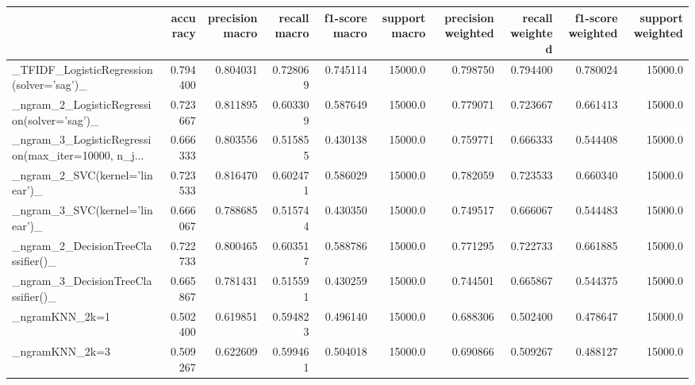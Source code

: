 \begin{tabular}{lrrrrrrrrr}
\toprule
{} &  accuracy &  precision macro &  recall macro &  f1-score macro &  support macro &  precision weighted &  recall weighted &  f1-score weighted &  support weighted \\
\midrule
\_TFIDF\_LogisticRegression(solver='sag')\_           &  0.794400 &         0.804031 &      0.728069 &        0.745114 &        15000.0 &            0.798750 &         0.794400 &           0.780024 &           15000.0 \\
\_ngram\_2\_LogisticRegression(solver='sag')\_         &  0.723667 &         0.811895 &      0.603309 &        0.587649 &        15000.0 &            0.779071 &         0.723667 &           0.661413 &           15000.0 \\
\_ngram\_3\_LogisticRegression(max\_iter=10000, n\_j... &  0.666333 &         0.803556 &      0.515855 &        0.430138 &        15000.0 &            0.759771 &         0.666333 &           0.544408 &           15000.0 \\
\_ngram\_2\_SVC(kernel='linear')\_                     &  0.723533 &         0.816470 &      0.602471 &        0.586029 &        15000.0 &            0.782059 &         0.723533 &           0.660340 &           15000.0 \\
\_ngram\_3\_SVC(kernel='linear')\_                     &  0.666067 &         0.788685 &      0.515744 &        0.430350 &        15000.0 &            0.749517 &         0.666067 &           0.544483 &           15000.0 \\
\_ngram\_2\_DecisionTreeClassifier()\_                 &  0.722733 &         0.800465 &      0.603517 &        0.588786 &        15000.0 &            0.771295 &         0.722733 &           0.661885 &           15000.0 \\
\_ngram\_3\_DecisionTreeClassifier()\_                 &  0.665867 &         0.781431 &      0.515591 &        0.430259 &        15000.0 &            0.744501 &         0.665867 &           0.544375 &           15000.0 \\
\_ngramKNN\_2k=1                                     &  0.502400 &         0.619851 &      0.594823 &        0.496140 &        15000.0 &            0.688306 &         0.502400 &           0.478647 &           15000.0 \\
\_ngramKNN\_2k=3                                     &  0.509267 &         0.622609 &      0.599461 &        0.504018 &        15000.0 &            0.690866 &         0.509267 &           0.488127 &           15000.0 \\

\end{tabular}
